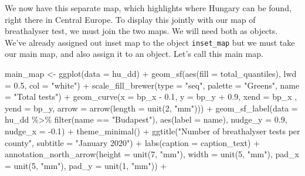 \documentclass[
]{book}
\newenvironment{Shaded}{\begin{snugshade}}{\end{snugshade}}
\newcommand{\AttributeTok}[1]{\textcolor[rgb]{0.77,0.63,0.00}{#1}}
\newcommand{\DecValTok}[1]{\textcolor[rgb]{0.00,0.00,0.81}{#1}}
\newcommand{\FloatTok}[1]{\textcolor[rgb]{0.00,0.00,0.81}{#1}}
\newcommand{\FunctionTok}[1]{\textcolor[rgb]{0.00,0.00,0.00}{#1}}
\newcommand{\NormalTok}[1]{#1}
\newcommand{\OtherTok}[1]{\textcolor[rgb]{0.56,0.35,0.01}{#1}}
\newcommand{\SpecialCharTok}[1]{\textcolor[rgb]{0.00,0.00,0.00}{#1}}
\newcommand{\StringTok}[1]{\textcolor[rgb]{0.31,0.60,0.02}{#1}}
\begin{document}
We now have this separate map, which highlights where Hungary can be found, right there in Central Europe. To display this jointly with our map of breathalyser test, we must join the two maps. We will need both as objects. We've already assigned out inset map to the object \texttt{inset\_map} but we must take our main map, and also assign it to an object. Let's call this main map.

\begin{Shaded}
\begin{Highlighting}[]
\NormalTok{main\_map }\OtherTok{\textless{}{-}} \FunctionTok{ggplot}\NormalTok{(}\AttributeTok{data =}\NormalTok{ hu\_dd) }\SpecialCharTok{+} 
  \FunctionTok{geom\_sf}\NormalTok{(}\FunctionTok{aes}\NormalTok{(}\AttributeTok{fill =}\NormalTok{ total\_quantiles), }\AttributeTok{lwd =} \FloatTok{0.5}\NormalTok{, }\AttributeTok{col =} \StringTok{"white"}\NormalTok{) }\SpecialCharTok{+} 
  \FunctionTok{scale\_fill\_brewer}\NormalTok{(}\AttributeTok{type =} \StringTok{"seq"}\NormalTok{, }\AttributeTok{palette =} \StringTok{"Greens"}\NormalTok{, }\AttributeTok{name =} \StringTok{"Total tests"}\NormalTok{) }\SpecialCharTok{+} 
  \FunctionTok{geom\_curve}\NormalTok{(}\AttributeTok{x =}\NormalTok{ bp\_x }\SpecialCharTok{{-}} \FloatTok{0.1}\NormalTok{, }
             \AttributeTok{y =}\NormalTok{ bp\_y }\SpecialCharTok{+} \FloatTok{0.9}\NormalTok{, }
             \AttributeTok{xend =}\NormalTok{ bp\_x , }
             \AttributeTok{yend =}\NormalTok{ bp\_y, }
             \AttributeTok{arrow =} \FunctionTok{arrow}\NormalTok{(}\AttributeTok{length =} \FunctionTok{unit}\NormalTok{(}\DecValTok{2}\NormalTok{, }\StringTok{"mm"}\NormalTok{))) }\SpecialCharTok{+}
  \FunctionTok{geom\_sf\_label}\NormalTok{(}\AttributeTok{data =}\NormalTok{ hu\_dd }\SpecialCharTok{\%\textgreater{}\%} \FunctionTok{filter}\NormalTok{(name }\SpecialCharTok{==} \StringTok{"Budapest"}\NormalTok{), }
                \FunctionTok{aes}\NormalTok{(}\AttributeTok{label =}\NormalTok{ name), }
                \AttributeTok{nudge\_y =} \FloatTok{0.9}\NormalTok{, }
                \AttributeTok{nudge\_x =} \SpecialCharTok{{-}}\FloatTok{0.1}\NormalTok{) }\SpecialCharTok{+} 
  \FunctionTok{theme\_minimal}\NormalTok{() }\SpecialCharTok{+} 
  \FunctionTok{ggtitle}\NormalTok{(}\StringTok{"Number of breathalyser tests per county"}\NormalTok{, }\AttributeTok{subtitle =} \StringTok{"January 2020"}\NormalTok{) }\SpecialCharTok{+} 
  \FunctionTok{labs}\NormalTok{(}\AttributeTok{caption =}\NormalTok{ caption\_text) }\SpecialCharTok{+} 
  \FunctionTok{annotation\_north\_arrow}\NormalTok{(}\AttributeTok{height =} \FunctionTok{unit}\NormalTok{(}\DecValTok{7}\NormalTok{, }\StringTok{"mm"}\NormalTok{), }\AttributeTok{width =} \FunctionTok{unit}\NormalTok{(}\DecValTok{5}\NormalTok{, }\StringTok{"mm"}\NormalTok{), }\AttributeTok{pad\_x =} \FunctionTok{unit}\NormalTok{(}\DecValTok{5}\NormalTok{, }\StringTok{"mm"}\NormalTok{), }\AttributeTok{pad\_y =} \FunctionTok{unit}\NormalTok{(}\DecValTok{1}\NormalTok{, }\StringTok{"mm"}\NormalTok{)) }\SpecialCharTok{+} 

\end{Highlighting}
\end{Shaded}
\end{document}
